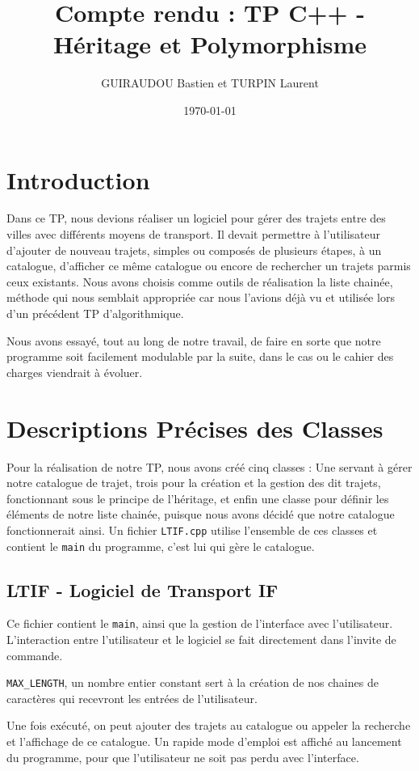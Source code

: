 \documentclass[11pt, a4paper]{article}
\title{Compte rendu : TP C++ - Héritage et Polymorphisme}
\author{GUIRAUDOU Bastien et TURPIN Laurent}
\date{\today}
\begin{document}
\maketitle

\section{Introduction}
Dans ce TP, nous devions réaliser un logiciel pour gérer des trajets entre des villes avec
différents moyens de transport. Il devait permettre à l'utilisateur d'ajouter de nouveau trajets,
simples ou composés de plusieurs étapes, à un catalogue, d'afficher ce même catalogue ou encore de
rechercher un trajets parmis ceux existants. Nous avons choisis comme outils de réalisation la
liste chainée, méthode qui nous semblait appropriée car nous l'avions déjà vu et utilisée lors d'un
précédent TP d'algorithmique.

Nous avons essayé, tout au long de notre travail, de faire en sorte que notre programme soit
facilement modulable par la suite, dans le cas ou le cahier des charges viendrait à évoluer.
\section{Descriptions Précises des Classes}
Pour la réalisation de notre TP, nous avons créé cinq classes : Une servant à gérer notre catalogue
de trajet, trois pour la création et la gestion des dit trajets, fonctionnant sous le principe de
l'héritage, et enfin une classe pour définir les éléments de notre liste chainée, puisque nous avons
décidé que notre catalogue fonctionnerait ainsi. Un fichier \texttt{LTIF.cpp} utilise l'ensemble de
ces classes et contient le \texttt{main} du programme, c'est lui qui gère le catalogue.

\subsection{LTIF - Logiciel de Transport IF}
Ce fichier contient le \texttt{main}, ainsi que la gestion de l'interface avec l'utilisateur.
L'interaction entre l'utilisateur et le logiciel se fait directement dans l'invite de commande.

\texttt{MAX\_LENGTH}, un nombre entier constant sert à la création de nos chaines de caractères qui
recevront les entrées de l'utilisateur.

Une fois exécuté, on peut ajouter des trajets au catalogue ou appeler la recherche et l'affichage
de ce catalogue. Un rapide mode d'emploi est affiché au lancement du programme, pour que
l'utilisateur ne soit pas perdu avec l'interface.
\end{document}
